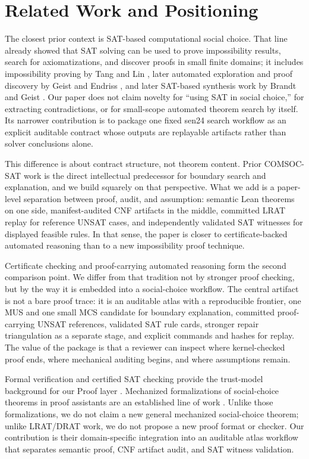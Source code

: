 \section{Related Work and Positioning}

The closest prior context is SAT-based computational social choice.
That line already showed that SAT solving can be used to prove impossibility results, search for axiomatizations, and discover proofs in small finite domains; it includes impossibility proving by Tang and Lin \citep{tanglin2009computer}, later automated exploration and proof discovery by Geist and Endriss \citep{geist2011automated}, and later SAT-based synthesis work by Brandt and Geist \citep{brandtgeist2016strategyproof}.
Our paper does not claim novelty for ``using SAT in social choice,'' for extracting contradictions, or for small-scope automated theorem search by itself.
Its narrower contribution is to package one fixed sen24 search workflow as an explicit auditable contract whose outputs are replayable artifacts rather than solver conclusions alone.

This difference is about contract structure, not theorem content.
Prior COMSOC-SAT work is the direct intellectual predecessor for boundary search and explanation, and we build squarely on that perspective.
What we add is a paper-level separation between proof, audit, and assumption: semantic Lean theorems on one side, manifest-audited CNF artifacts in the middle, committed LRAT replay for reference UNSAT cases, and independently validated SAT witnesses for displayed feasible rules.
In that sense, the paper is closer to certificate-backed automated reasoning than to a new impossibility proof technique.

Certificate checking and proof-carrying automated reasoning form the second comparison point.
We differ from that tradition not by stronger proof checking, but by the way it is embedded into a social-choice workflow.
The central artifact is not a bare proof trace: it is an auditable atlas with a reproducible frontier, one MUS and one small MCS candidate for boundary explanation, committed proof-carrying UNSAT references, validated SAT rule cards, stronger repair triangulation as a separate stage, and explicit commands and hashes for replay.
The value of the package is that a reviewer can inspect where kernel-checked proof ends, where mechanical auditing begins, and where assumptions remain.

Formal verification and certified SAT checking provide the trust-model background for our Proof layer \citep{moura2021lean4,cruzfilipe2017lrat,wetzler2014drat}.
Mechanized formalizations of social-choice theorems in proof assistants are an established line of work \citep{nipkow2009social}.
Unlike those formalizations, we do not claim a new general mechanized social-choice theorem; unlike LRAT/DRAT work, we do not propose a new proof format or checker.
Our contribution is their domain-specific integration into an auditable atlas workflow that separates semantic proof, CNF artifact audit, and SAT witness validation.

